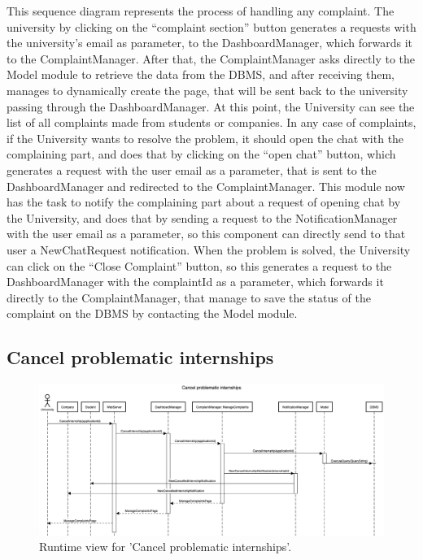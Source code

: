 This sequence diagram represents the process of handling any complaint. The university by clicking on the “complaint section” button generates a requests with the university’s email as parameter, to the DashboardManager, which forwards it to the ComplaintManager. After that, the ComplaintManager asks directly to the Model module to retrieve the data from the DBMS, and after receiving them, manages to dynamically create the page, that will be sent back to the university passing through the DashboardManager. At this point, the University can see the list of all complaints made from students or companies. In any case of complaints, if the University wants to resolve the problem, it should open the chat with the complaining part, and does that by clicking on the “open chat” button, which generates a request with the user email as a parameter, that is sent to the DashboardManager and redirected to the ComplaintManager. This module now has the task to notify the complaining part about a request of opening chat by the University, and does that by sending a request to the NotificationManager with the user email as a parameter, so this component can directly send to that user a NewChatRequest notification. When the problem is solved, the University can click on the “Close Complaint” button, so this generates a request to the DashboardManager with the complaintId as a parameter, which forwards it directly to the ComplaintManager, that manage to save the status of the complaint on the DBMS by contacting the Model module.



\subsection{Cancel problematic internships}
\begin{figure}[H]
    \begin{center}
        \includegraphics[width=0.8\linewidth]{DD/LaTeX/Images/RuntimeView/CancelProblematicInternships.png}
        \caption{Runtime view for 'Cancel problematic internships'.}
        \label{fig:runtime_CancelProblematicInternships}%
    \end{center}
\end{figure}


